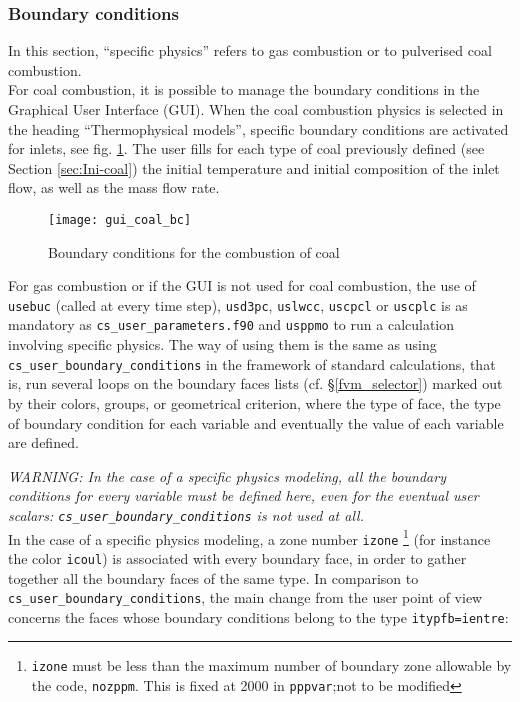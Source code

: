 {{{%
\subsubsection{Boundary conditions}\label{sec:coal-cl}
In this section, ``specific physics'' refers to gas combustion or
to pulverised coal combustion.\\
For coal combustion, it is possible to manage the boundary conditions in the Graphical User Interface (GUI). When the coal combustion physics is selected in the heading ``Thermophysical models'', specific boundary conditions are activated for inlets, see fig. \ref{fig:cond_lim-coal}. The user fills for each type of coal previously defined (see Section \ref{sec:Ini-coal}) the initial temperature and initial composition of the inlet flow, as well as the mass flow rate.

\begin{figure}[!ht]
\begin{center}
\texttt{[image: gui\_coal\_bc]}
\caption{Boundary conditions for the combustion of coal}
\label{fig:cond_lim-coal}
\end{center}
\end{figure}

For gas combustion or if the GUI is not used for coal combustion, the use of \texttt{usebuc} (called at every time step),
\texttt {usd3pc}, \texttt{uslwcc}, \texttt{uscpcl} or \texttt{uscplc} is as
mandatory as \texttt{cs\_user\_parameters.f90} and \texttt{usppmo} to run a calculation involving specific physics. The way of using them is the same as using
\texttt{cs\_user\_boundary\_conditions} in the framework of standard calculations, that is, run several loops on the boundary faces lists (cf. \S\ref{fvm_selector})
marked out by their colors, groups, or  geometrical criterion, where
the type of face, the type of boundary condition for each variable and
eventually the value of each variable are defined.

{\em WARNING: In the case of a specific physics modeling, all the
boundary conditions for every variable must be defined here, even for
the eventual user scalars: {\em \texttt{cs\_user\_boundary\_conditions}} is not used at all.}\\

In the case of a specific physics modeling, a zone number \texttt{izone}
\footnote{\texttt{izone} must be less than the maximum number of boundary
zone allowable by the code, \texttt{nozppm}. This is fixed at 2000 in
 \texttt{pppvar};not to be modified} (for
instance the color \texttt{icoul}) is associated with every boundary face, in
order to gather together all the boundary faces of the same type. In
comparison to \texttt{cs\_user\_boundary\_conditions}, the main change from the user point of
view concerns the faces whose boundary conditions belong to the type
\texttt{itypfb=ientre}:

}}}
